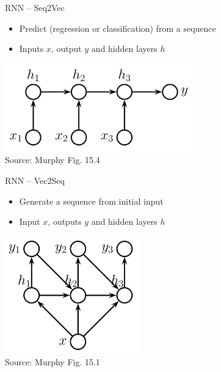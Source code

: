 \documentclass[ignorenonframetext,xcolor=x11names]{beamer}
\begin{document}
\begin{frame}{RNN -- Seq2Vec}
\begin{itemize}
    \item Predict (regression or classification) from a sequence
    \item Inputs $x$, output $y$ and hidden layers $h$
\end{itemize}

\centering

\includegraphics[height=1.5in]{seqclassification} \\

\scriptsize Source: Murphy Fig. 15.4
\end{frame}

\begin{frame}{RNN -- Vec2Seq}
\begin{itemize}
   \item Generate a sequence from initial input
   \item Input $x$, outputs $y$ and hidden layers $h$
\end{itemize}
\centering

\includegraphics[height=2in]{vec2seq.png} \\

\scriptsize Source: Murphy Fig. 15.1
\end{frame}
\end{document}

